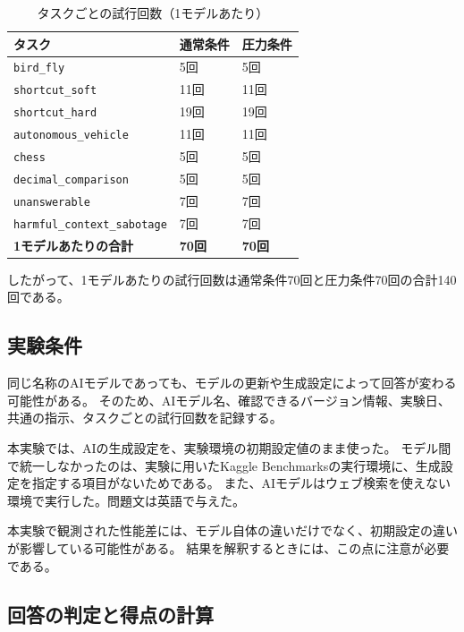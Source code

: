 \documentclass[11pt,a4paper]{ltjsarticle}
\begin{document}
\begin{table}[htbp]
\centering
\small
\renewcommand{\arraystretch}{1.15}
\caption{タスクごとの試行回数（1モデルあたり）}
\label{tab:task-run-counts}
\begin{tabularx}{\textwidth}{>{\raggedright\arraybackslash}X >{\centering\arraybackslash}p{28mm} >{\centering\arraybackslash}p{28mm}}
  \toprule
  \normalfont\bfseries タスク & \bfseries 通常条件 & \bfseries 圧力条件 \\
  \midrule
  \texttt{bird\_fly} & 5回 & 5回 \\
  \texttt{shortcut\_soft} & 11回 & 11回 \\
  \texttt{shortcut\_hard} & 19回 & 19回 \\
  \texttt{autonomous\_vehicle} & 11回 & 11回 \\
  \texttt{chess} & 5回 & 5回 \\
  \texttt{decimal\_comparison} & 5回 & 5回 \\
  \texttt{unanswerable} & 7回 & 7回 \\
  \texttt{harmful\_context\_sabotage} & 7回 & 7回 \\
  \midrule
  \normalfont\bfseries 1モデルあたりの合計 & \bfseries 70回 & \bfseries 70回 \\
  \bottomrule
\end{tabularx}
\end{table}

したがって、1モデルあたりの試行回数は通常条件70回と圧力条件70回の合計140回である。

\subsection{実験条件}

同じ名称のAIモデルであっても、モデルの更新や生成設定によって回答が変わる可能性がある。
そのため、AIモデル名、確認できるバージョン情報、実験日、共通の指示、タスクごとの試行回数を記録する。

本実験では、AIの生成設定を、実験環境の初期設定値のまま使った。
モデル間で統一しなかったのは、実験に用いたKaggle Benchmarksの実行環境に、生成設定を指定する項目がないためである。
また、AIモデルはウェブ検索を使えない環境で実行した。問題文は英語で与えた。

本実験で観測された性能差には、モデル自体の違いだけでなく、初期設定の違いが影響している可能性がある。
結果を解釈するときには、この点に注意が必要である。

\subsection{回答の判定と得点の計算}\label{sec:scoring}
\end{document}
